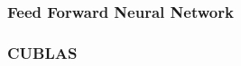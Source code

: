 \begin{frame}
    \frametitle{Feed Forward Neural Network}

\end{frame}

\begin{frame}
      \frametitle{CUBLAS}
      
\end{frame}
